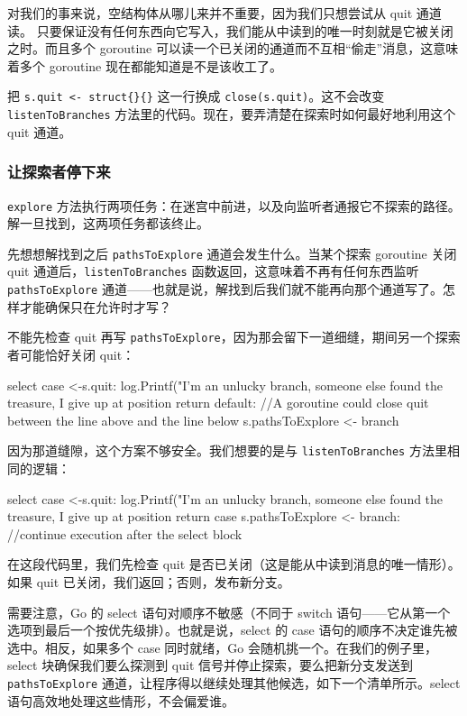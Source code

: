 对我们的事来说，空结构体从哪儿来并不重要，因为我们只想尝试从 quit 通道读。
只要保证没有任何东西向它写入，我们能从中读到的唯一时刻就是它被关闭之时。而且多个 goroutine 可以读一个已关闭的通道而不互相``偷走''消息，这意味着多个 goroutine 现在都能知道是不是该收工了。

把 \texttt{s.quit <- struct\{\}\{\}} 这一行换成 \texttt{close(s.quit)}。这不会改变 \texttt{listenToBranches} 方法里的代码。现在，要弄清楚在探索时如何最好地利用这个 quit 通道。

\subsubsection*{让探索者停下来}

\texttt{explore} 方法执行两项任务：在迷宫中前进，以及向监听者通报它不探索的路径。解一旦找到，这两项任务都该终止。

先想想解找到之后 \texttt{pathsToExplore} 通道会发生什么。当某个探索 goroutine 关闭 quit 通道后，\texttt{listenToBranches} 函数返回，这意味着不再有任何东西监听 \texttt{pathsToExplore} 通道——也就是说，解找到后我们就不能再向那个通道写了。怎样才能确保只在允许时才写？

不能先检查 quit 再写 \texttt{pathsToExplore}，因为那会留下一道细缝，期间另一个探索者可能恰好关闭 quit：

\begin{gocode}[]
select {
case <-s.quit:
    log.Printf("I'm an unlucky branch, someone else found the treasure, I
give up at position %
    return
default:
    //A goroutine could close quit between the line above and the line below
    s.pathsToExplore <- branch
}
\end{gocode}

因为那道缝隙，这个方案不够安全。我们想要的是与 \texttt{listenToBranches} 方法里相同的逻辑：

\begin{gocode}[]
select {
case <-s.quit:
    log.Printf("I'm an unlucky branch, someone else found the treasure, I
give up at position %
    return
case s.pathsToExplore <- branch:
    //continue execution after the select block
}
\end{gocode}

在这段代码里，我们先检查 quit 是否已关闭（这是能从中读到消息的唯一情形）。如果 quit 已关闭，我们返回；否则，发布新分支。

需要注意，Go 的 select 语句对顺序不敏感（不同于 switch 语句——它从第一个选项到最后一个按优先级排）。也就是说，select 的 case 语句的顺序不决定谁先被选中。相反，如果多个 case 同时就绪，Go 会随机挑一个。在我们的例子里，select 块确保我们要么探测到 quit 信号并停止探索，要么把新分支发送到 \texttt{pathsToExplore} 通道，让程序得以继续处理其他候选，如下一个清单所示。select 语句高效地处理这些情形，不会偏爱谁。

